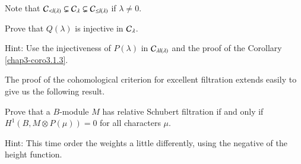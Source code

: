 Note that $\mathcal{C}_{<l(\lambda)}\subsetneq \mathcal{C}_{\lambda}\subsetneq \mathcal{C}_{\leq
  l(\lambda)}$ if $\lambda\neq 0$.

\begin{exercise}\label{chap3-exer3.3.2}
Prove that $Q(\lambda)$ is injective in $\mathcal{C}_{\lambda}$.
\end{exercise}

Hint: Use the injectiveness of $P(\lambda)$ in $\mathcal{C}_{\lambda
  l(\lambda)}$ and the proof of the Corollary \ref{chap3-coro3.1.3}.

The proof of the cohomological criterion for excellent filtration
extends easily to give us the following result.

\begin{exercise}\label{chap3-exer3.3.3} 
Prove that a $B$-module $M$ has relative Schubert
filtration if and
only if $H^{1}(B,M\otimes P(\mu))=0$ for all characters $\mu$.
\end{exercise}

Hint: This time order the weights a little differently, using the
negative of the height function. 









